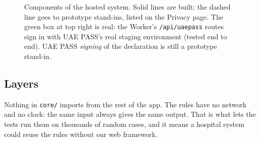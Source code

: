 \documentclass[10.5pt,a4paper]{article}
\newcommand{\code}[1]{\texttt{\small #1}}
\begin{document}
\begin{figure}[!htbp]
\caption{Components of the hosted system. Solid lines are built; the dashed line goes to prototype stand-ins, listed on the Privacy page. The green box at top right is real: the Worker's \code{/api/uaepass} routes sign in with UAE PASS's real staging environment (tested end to end). UAE PASS \emph{signing} of the declaration is still a prototype stand-in.}
\end{figure}

\subsection{Layers}

Nothing in \code{core/} imports from the rest of the app. The rules have no network and no clock: the same input
always gives the same output. That is what lets the tests run them on thousands of random cases, and it means a
hospital system could reuse the rules without our web framework.
\end{document}
